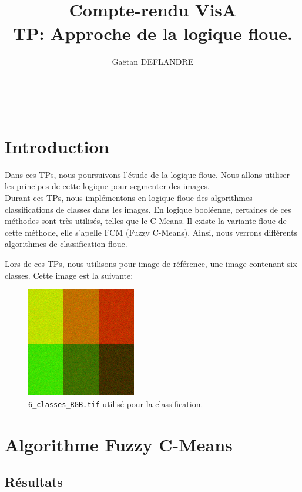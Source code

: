 \documentclass[a4paper,11pt]{article}
\title{
  \noindent\hrulefill \\
  \vspace{10mm}
  \textbf{Compte-rendu VisA} \\
  \vspace{5mm}
  TP: Approche de la logique floue.
}
\author{Gaëtan DEFLANDRE}
\begin{document}
\maketitle
\noindent\hrulefill \\


\section*{Introduction}

Dans ces TPs, nous poursuivons l'étude de la logique floue. Nous allons 
utiliser les principes de cette logique pour segmenter des images. \\

Durant ces TPs, nous implémentons en logique floue des algorithmes 
classifications de classes dans les images. En logique booléenne, 
certaines de ces méthodes sont très utilisés, telles que le C-Means. Il 
existe la variante floue de cette méthode, elle s'apelle FCM (Fuzzy 
C-Means). Ainsi, nous verrons différents algorithmes de classification 
floue.\\


\newpage



Lors de ces TPs, nous utilisons pour image de référence, une image 
contenant six classes. Cette image est la suivante:

\begin{figure}[H]
  \begin{center} 
    \includegraphics[width=180px]{../img/6_classes_RGB.png}
    \caption{\texttt{6\_classes\_RGB.tif} utilisé pour la classification.}
  \end{center}
\end{figure}

\section{Algorithme Fuzzy C-Means}

\subsection{Résultats}
\end{document}
